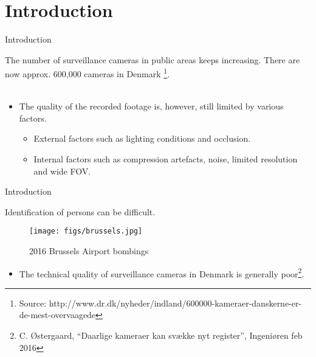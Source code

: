 \section{Introduction}
\begin{frame}{Introduction}{}
    \begin{block}{}
        The number of surveillance cameras in public areas keeps increasing. There are now approx. 600,000 cameras in Denmark \footnote{Source: http://www.dr.dk/nyheder/indland/600000-kameraer-danskerne-er-de-mest-overvaagede}.
        ~\\
        ~\\
        \begin{itemize}
            \item The quality of the recorded footage is, however, still limited by various factors.
                \begin{itemize}
                    \item External factors such as lighting conditions and occlusion.
                    \item Internal factors such as compression artefacts, noise, limited resolution and wide FOV.
                \end{itemize}
        \end{itemize}
    \end{block}
\end{frame}

\begin{frame}{Introduction}{}
    \begin{block}{Identification of persons can be difficult.}
        \centering
        \begin{figure}
            \texttt{[image: figs/brussels.jpg]}
            \caption*{\scriptsize 2016 Brussels Airport bombings}
        \end{figure}
        \vspace{-0.5cm}
        \begin{itemize}
            \item The technical quality of surveillance cameras in Denmark is generally poor\footnote{C. Østergaard, “Daarlige kameraer kan svække nyt register”, Ingeniøren feb 2016}.
        \end{itemize}
    \end{block}
\end{frame}
